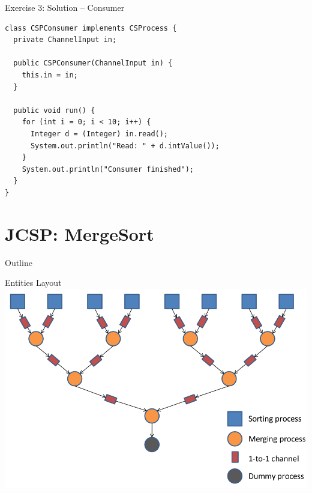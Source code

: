 \begin{frame}[fragile]{Exercise 3: Solution -- Consumer}
\begin{lstlisting}[basicstyle=\fontsize{9}{11}\selectfont\ttfamily]
class CSPConsumer implements CSProcess {
  private ChannelInput in;

  public CSPConsumer(ChannelInput in) {
    this.in = in;
  }

  public void run() {
    for (int i = 0; i < 10; i++) {
      Integer d = (Integer) in.read();
      System.out.println("Read: " + d.intValue());
    }
    System.out.println("Consumer finished");
  }
}
\end{lstlisting}
\end{frame}


\section{JCSP: MergeSort}

\begin{frame}{Outline}
  \tableofcontents[current]
\end{frame}

\begin{frame}{Entities Layout}
  \includegraphics[width=\textwidth]{figures/mergesort}
\end{frame}

